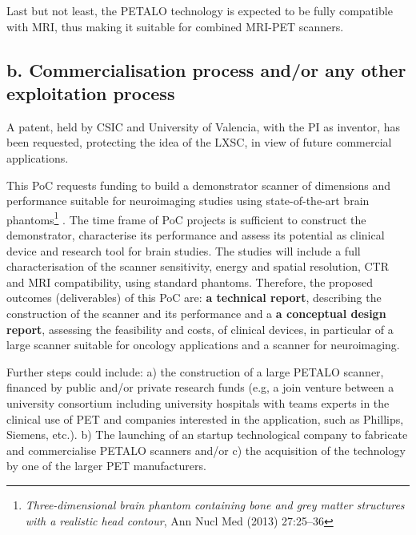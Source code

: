\documentclass[11pt,a4paper]{article}
\begin{document}
Last but not least, the PETALO technology is expected to be fully compatible with MRI, thus making it suitable for combined MRI-PET scanners. 



\subsection*{b. Commercialisation process and/or any other exploitation process} 
A patent, held by CSIC and University of Valencia, with the PI as inventor, has been requested, protecting the idea of the LXSC, in view of future commercial applications.

This PoC requests funding to build a demonstrator scanner of dimensions and performance suitable for neuroimaging studies using state-of-the-art brain phantoms\footnote{{\em Three-dimensional brain phantom containing bone and grey matter structures with a realistic head contour}, Ann Nucl Med (2013) 27:25--36} . The time frame of PoC projects is sufficient to construct the demonstrator, characterise its performance and assess its potential as clinical device and research tool for brain studies. The studies will include a full characterisation of the scanner sensitivity, energy and spatial resolution, CTR and MRI compatibility, using standard phantoms. Therefore, the proposed outcomes (deliverables) of this PoC are: {\bf a technical report}, describing the construction of the scanner and its performance and a {\bf a conceptual design report}, assessing the feasibility and costs, of clinical devices, in particular of a large scanner suitable for oncology applications and a scanner for neuroimaging. 

Further steps could include: a) the construction of a large PETALO scanner, financed by public and/or private research funds (e.g, a join venture between a university consortium including university hospitals with teams experts in the clinical use of PET and companies interested in the application, such as Phillips, Siemens, etc.). b) The launching of an startup technological company to fabricate and commercialise PETALO scanners and/or c) the acquisition of the technology by one of the larger PET manufacturers. 
\newpage
\end{document}

